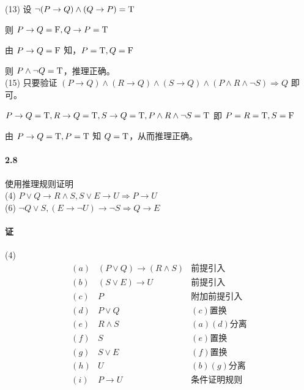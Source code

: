 \documentclass[hyperref, UTF8]{ctexart}
\newcommand{\true}{{\rm T}}
\newcommand{\false}{{\rm F}}
\begin{document}
(13)
设 $\lnot (P \rightarrow Q) \land (Q \rightarrow P)= \true $

\qquad 则 $P \rightarrow Q= \false , Q \rightarrow P= \true $

\qquad 由 $P \rightarrow Q= \false$ 知，$P= \true , Q= \false $

\qquad 则 $P\land \lnot Q=\true$，推理正确。\\

(15) 只要验证 $(P \rightarrow Q) \land (R \rightarrow Q) \land (S \rightarrow Q) \land (P \land R \land \lnot S) \Rightarrow Q$ 即可。

\qquad $P \rightarrow Q = \true, R \rightarrow Q = \true, S \rightarrow Q = \true, P \land R \land \lnot S = \true$ 即 $P=R=\true, S=\false$

\qquad 由 $P \rightarrow Q = \true, P = \true$ 知 $Q = \true$，从而推理正确。

\paragraph{2.8}\label{2.8}
使用推理规则证明 \\

(4) $ P \lor Q \rightarrow R \land S, S \lor E \rightarrow U \Rightarrow P \rightarrow U $ \\

(6) $  \lnot Q \lor S, (E \rightarrow \lnot U) \rightarrow \lnot S \Rightarrow Q \rightarrow E $ \\

\paragraph{证}

(4) 
\begin{align*}
(a) & (P \lor Q) \rightarrow (R \land S) & \text{前提引入} \\ 
(b) & (S \lor E) \rightarrow U & \text{前提引入} \\ 
(c) & P & \text{附加前提引入} \\ 
(d) & P \lor Q & (c)\text{置换} \\ 
(e) & R \land S & (a)(d)\text{分离} \\
(f) & S & (e)\text{置换} \\ 
(g) & S \lor E & (f)\text{置换} \\ 
(h) & U & (b)(g)\text{分离} \\
(i) & P \rightarrow U & \text{条件证明规则}
\end{align*}
\end{document}
